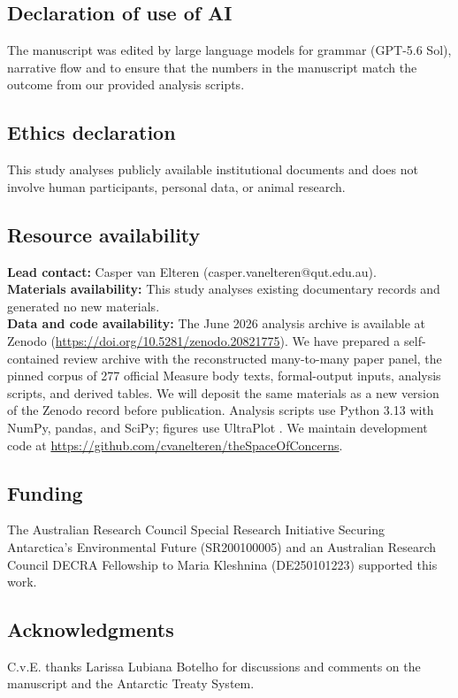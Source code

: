 \documentclass{fun_article}
\begin{document}
\subsection*{Declaration of use of AI}
The manuscript was edited by large language models for grammar (GPT-5.6 Sol), narrative flow and to ensure that the numbers in the manuscript match the outcome from our provided analysis scripts.

\subsection*{Ethics declaration}
This study analyses publicly available institutional documents and does not involve human participants, personal data, or animal research.

\subsection*{Resource availability}
\noindent\textbf{Lead contact:} Casper van Elteren (casper.vanelteren@qut.edu.au).\\
\textbf{Materials availability:} This study analyses existing documentary records and generated no new materials.\\
\textbf{Data and code availability:} The June 2026 analysis archive is available at Zenodo (\url{https://doi.org/10.5281/zenodo.20821775}). We have prepared a self-contained review archive with the reconstructed many-to-many paper panel, the pinned corpus of 277 official Measure body texts, formal-output inputs, analysis scripts, and derived tables. We will deposit the same materials as a new version of the Zenodo record before publication. Analysis scripts use Python 3.13 with NumPy, pandas, and SciPy; figures use UltraPlot \cite{vanElteren2025}. We maintain development code at \url{https://github.com/cvanelteren/theSpaceOfConcerns}.

\subsection*{Funding}
The Australian Research Council Special Research Initiative Securing Antarctica's Environmental Future (SR200100005) and an Australian Research Council DECRA Fellowship to Maria Kleshnina (DE250101223) supported this work.

\subsection*{Acknowledgments}
C.v.E. thanks Larissa Lubiana Botelho for discussions and comments on the manuscript and the Antarctic Treaty System.
\end{document}
